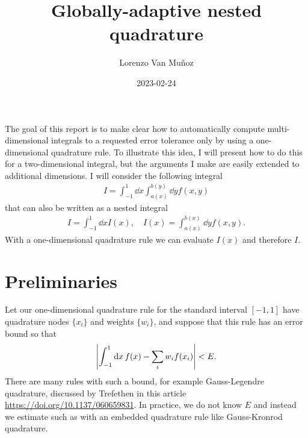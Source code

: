 \documentclass{article}
\title{Globally-adaptive nested quadrature}
\author{Lorenzo Van Mu\~noz}
\date{2023-02-24}
\begin{document}
\maketitle

The goal of this report is to make clear how to automatically compute
multi-dimensional integrals to a requested error tolerance only by using a
one-dimensional quadrature rule. To illustrate this idea, I will present how to
do this for a two-dimensional integral, but the arguments I make are easily
extended to additional dimensions. I will consider the following integral
\begin{align}
    \label{eqn:2dint}
    I = \int_{-1}^{1} \dd{x} \int_{a(x)}^{b(y)} \dd{y} f(x,y)
\end{align}
that can also be written as a nested integral
\begin{align}
    I = \int_{-1}^{1} \dd{x} I(x),
    \quad
    I(x) = \int_{a(x)}^{b(x)} \dd{y} f(x,y).
\end{align}
With a one-dimensional quadrature rule we can evaluate $I(x)$ and therefore $I$.

\section{Preliminaries}

Let our one-dimensional quadrature rule for the standard interval $[-1,1]$ have
quadrature nodes $\{x_i\}$ and weights $\{w_i\}$, and suppose that this rule has
an error bound so that
\begin{align}
    \label{eqn:rulebound}
    \abs{\int_{-1}^{1} \dd{x} f(x) - \sum_{i} w_i f(x_i)} < E.
\end{align}
There are many rules with such a bound, for example Gauss-Legendre quadrature,
discussed by Trefethen in this article \url{https://doi.org/10.1137/060659831}.
In practice, we do not know $E$ and instead we estimate such as with an embedded
quadrature rule like Gauss-Kronrod quadrature.
\end{document}
